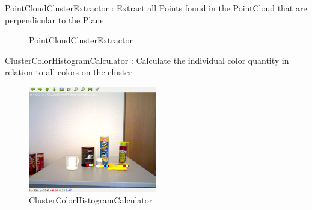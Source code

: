 \documentclass[main.tex]{subfiles}
\begin{document}
\begin{itemize}
    \begin{minipage}[t]{\textwidth}
    \item PointCloudClusterExtractor : Extract all Points found in the PointCloud that are perpendicular to the Plane 
        \begin{figure}[H]
                \centering
                \caption{PointCloudClusterExtractor}
          \end{figure}
    \end{minipage}

    \begin{minipage}[t]{\textwidth}
    \item ClusterColorHistogramCalculator : Calculate the individual color quantity in relation to all colors on the cluster   
        \begin{figure}[H]
                \centering
                \includegraphics[width=0.5\textwidth]{pictures/2d/ClusterColorHistogramAnnotator.png}
                \caption{ClusterColorHistogramCalculator}
          \end{figure}
    \end{minipage}


\end{itemize}
\end{document}
